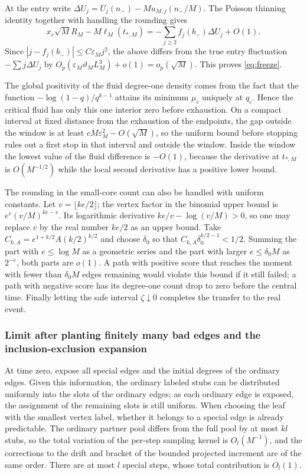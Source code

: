 At the entry write $\Delta U_j=U_j(n_-)-Mu_{M,j}(n_-/M)$. The Poisson thinning identity together with
handling the rounding gives
\[
x_c\sqrt M R_M-M\ell_M(t_{*,M})
=-\sum_{j\ge2}f_j(b_-)\Delta U_j+O(1).
\]
Since $|j-f_j(b_-)|\le C\varepsilon_Mj^2$, the above differs from the true entry fluctuation
$-\sum j\Delta U_j$ by $O_p(\varepsilon_M\vartheta_ML_M^3)+o(1)=o_p(\sqrt M)$. This proves
\eqref{eq:freeze}.

The global positivity of the fluid degree-one density comes from the fact that the function
$-\log(1-q)/q^{k-1}$ attains its minimum $\mu_c$ uniquely at $q_c$. Hence the critical fluid has only this
one interior zero before exhaustion. On a compact interval at fixed distance from the exhaustion of the
endpoints, the gap outside the window is at least $cM\varepsilon_M^2-O(\sqrt M)$, so the uniform bound before
stopping rules out a first stop in that interval and outside the window. Inside the window the lowest value
of the fluid difference is $-O(1)$, because the derivative at $t_{*,M}$ is $O(M^{-1/2})$ while the local
second derivative has a positive lower bound.

The rounding in the small-core count can also be handled with uniform constants. Let $v=\lfloor ke/2\rfloor$;
the vertex factor in the binomial upper bound is $e^v(v/M)^{ke-v}$. Its logarithmic derivative
$ke/v-\log(v/M)>0$, so one may replace $v$ by the real number $ke/2$ as an upper bound. Take
$C_{k,A}=e^{1+k/2}A(k/2)^{k/2}$ and choose $\delta_0$ so that $C_{k,A}\delta_0^{k/2-1}<1/2$. Summing the
part with $e\le\log M$ as a geometric series and the part with larger $e\le\delta_0M$ as $2^{-e}$, both
parts are $o(1)$. A path with positive score that reaches the moment with fewer than $\delta_0M$ edges
remaining would violate this bound if it still failed; a path with negative score has its degree-one count
drop to zero before the central time. Finally letting the safe interval $\zeta\downarrow0$ completes the
transfer to the real event.

\subsubsection{Limit after planting finitely many bad edges and the inclusion-exclusion expansion}
At time zero, expose all special edges and the initial degrees of the ordinary edges. Given this information,
the ordinary labeled stubs can be distributed uniformly into the slots of the ordinary edges; as each
ordinary edge is exposed, the assignment of the remaining slots is still uniform. When choosing the leaf with
the smallest vertex label, whether it belongs to a special edge is already predictable. The ordinary partner
pool differs from the full pool by at most $kl$ stubs, so the total variation of the per-step sampling kernel
is $O_l(M^{-1})$, and the corrections to the drift and bracket of the bounded projected increment are of the
same order. There are at most $l$ special steps, whose total contribution is $O_l(1)$.

